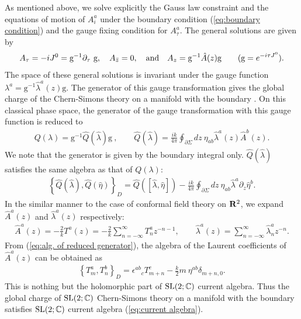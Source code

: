 \documentclass[a4paper,11pt]{article}
\begin{document}
As mentioned above, we solve explicitly the Gauss law constraint
and the equations of motion of $A_{i}^{a}$ under 
the boundary condition (\ref{eq:boundary condition}) and the gauge
fixing condition for $A_{\tau}^{a}$. The general solutions are given by
\begin{eqnarray}
A_{\tau}=-i J^{0}=\textrm{g}^{-1}\partial_{\tau}~\textrm{g}, \quad 
A_{\bar{z}}=0,\quad {\rm and}\quad 
A_{z}=\textrm{g}^{-1}\hat{A}(z)\textrm{g} 
\qquad(\textrm{g}=e^{-i\tau J^{0}}).
\label{eq:general solution}
\end{eqnarray}
The space of these general solutions is invariant under 
the gauge function $\lambda^{a}=
\textrm{g}^{-1}\hat{\lambda}^{a}(z)\textrm{g}$.
The generator of this gauge transformation gives the global
charge of the Chern-Simons theory on a manifold with the boundary 
\cite{Banados2}.
On this classical phase space, the generator of the gauge
transformation with this gauge function is reduced to
\begin{eqnarray}
Q(\lambda) = \textrm{g}^{-1}\hat{Q}(\hat{\lambda})\textrm{g}~, \qquad
\hat{Q}(\hat{\lambda})=\frac{ik}{4\pi}\oint_{\partial\Sigma}\!\!dz~
\eta_{ab}\hat{\lambda}^{a}(z)\hat{A}^{b}(z).
\end{eqnarray}
We note that the generator is given by the boundary integral only. 
$\hat{Q}(\hat{\lambda})$ satisfies the same algebra as that of
$Q(\lambda)$:
\begin{eqnarray}
\left\{\hat{Q}(\hat{\lambda}), \hat{Q}(\hat{\eta})\right\}_{D}=
\hat{Q}([\hat{\lambda},\hat{\eta}])
-\frac{ik}{4\pi}\oint_{\partial\Sigma}\!\!dz~
\eta_{ab}\hat{\lambda}^{a}\partial_{z}\hat{\eta}^{b}.
\label{eq:alg. of reduced generator}
\end{eqnarray}
In the similar manner to the case of conformal field theory on 
${\bf R}^{2}$, we expand $\hat{A}^{a}(z)$ and $\hat{\lambda}^{a}(z)$
respectively:
\begin{eqnarray}
\hat{A}^{a}(z) = -\frac{2}{k}T^{a}(z) =
-\frac{2}{k}\sum_{n=-\infty}^{\infty}T_{n}^{a}z^{-n-1}, \qquad
\hat{\lambda}^{a}(z)=\sum_{n=-\infty}^{\infty}\hat{\lambda}_{n}^{a}z^{-n}.
\end{eqnarray}
From (\ref{eq:alg. of reduced generator}), the algebra of
the Laurent coefficients of $\hat{A}^{a}(z)$ 
can be obtained as
\begin{eqnarray}
\left\{T_{m}^{a}, T_{n}^{b}\right\}_{D}=\epsilon^{ab}{}_{c}T_{m+n}^{c}
-\frac{k}{2} m~\eta^{ab}\delta_{m+n, 0}.
\label{eq:current algebra}
\end{eqnarray}
This is nothing but the holomorphic part of ${\rm SL}(2;\mathbb{C})$
current algebra. Thus the global charge of ${\rm SL}(2;\mathbb{C})$
Chern-Simons theory on a manifold with the boundary satisfies 
${\rm SL}(2;\mathbb{C})$ current algebra (\ref{eq:current algebra}).   
\end{document}
